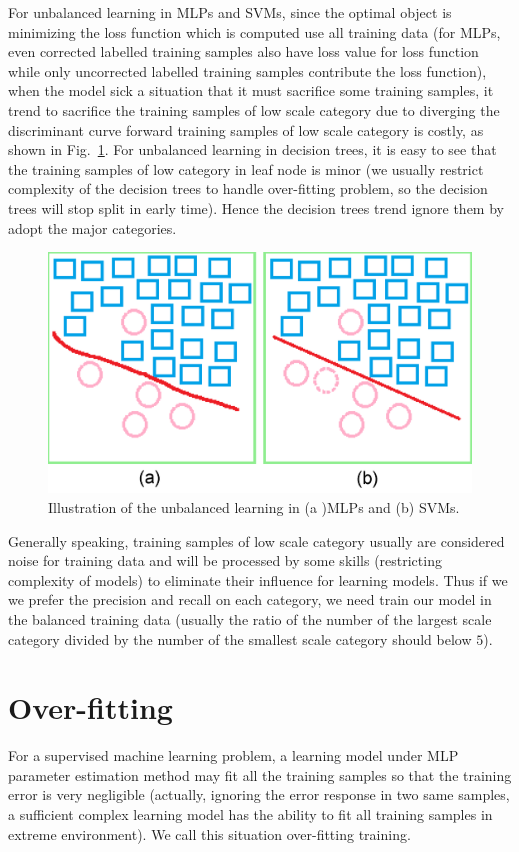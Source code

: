\documentclass[runningheads,openany]{xhlPaper}
\begin{document}
For unbalanced learning in MLPs and SVMs, since the optimal object is minimizing the loss function which is computed use all training data (for MLPs, even corrected labelled training samples also have loss value for loss function while only uncorrected labelled training samples contribute the loss function), when the model sick a situation that it must sacrifice some training samples, it trend to sacrifice the training samples of low scale category due to diverging the discriminant curve forward training samples of low scale category is costly, as shown in Fig.~\ref{fig:unbalanced_learning_mlp_svm}. 
For unbalanced learning in decision trees, it is easy to see that the training samples of low category in leaf node is minor (we usually restrict complexity of the decision trees to handle over-fitting problem, so the decision trees will stop split in early time). Hence the decision trees trend ignore them by adopt the major categories.

\begin{figure}
\centering
\includegraphics[width=0.7\linewidth]{unbalanced_learning_mlp_svm}
\caption{Illustration of the unbalanced learning in (a )MLPs  and (b) SVMs.}
\label{fig:unbalanced_learning_mlp_svm}
\end{figure}

Generally speaking, training samples of low scale category usually are considered noise for training data and will be processed by some skills (restricting complexity of models) to eliminate their influence for learning models.
Thus if we we prefer the precision and recall on each category, we need train our model in the balanced training data (usually the ratio of the number of the largest scale category divided by the number of the smallest scale category should below $5$).

\section{Over-fitting}
\label{sec:over_fitting}
For a supervised machine learning problem, a learning model under MLP parameter estimation method may fit all the training samples so that the training error is very negligible (actually, ignoring the error response in two same samples, a sufficient complex learning model has the ability to fit all training samples in extreme environment). We call this situation over-fitting training. 
\end{document}
